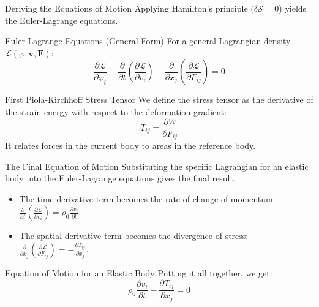 \documentclass{beamer}
\begin{document}
\begin{frame}{Deriving the Equations of Motion}
    Applying Hamilton's principle ($\delta\mathcal{S}=0$) yields the Euler-Lagrange equations.

    \begin{block}{Euler-Lagrange Equations (General Form)}
        For a general Lagrangian density $\mathcal{L}(\varphi, \mathbf{v}, \mathbf{F})$:
        $$ \frac{\partial\mathcal{L}}{\partial\varphi_{i}} - \frac{\partial}{\partial t}\left(\frac{\partial\mathcal{L}}{\partial v_{i}}\right) - \frac{\partial}{\partial x_{j}}\left(\frac{\partial\mathcal{L}}{\partial F_{ij}}\right) = 0 $$
    \end{block}
    \pause
    \begin{block}{First Piola-Kirchhoff Stress Tensor}
        We define the stress tensor as the derivative of the strain energy with respect to the deformation gradient:
        $$ T_{ij} = \frac{\partial W}{\partial F_{ij}} $$
        It relates forces in the current body to areas in the reference body.
    \end{block}
\end{frame}


\begin{frame}{The Final Equation of Motion}
    Substituting the specific Lagrangian for an elastic body into the Euler-Lagrange equations gives the final result.

    \begin{itemize}
        \item The time derivative term becomes the rate of change of momentum: $\frac{\partial}{\partial t}\left(\frac{\partial\mathcal{L}}{\partial v_{i}}\right) = \rho_0 \frac{\partial v_i}{\partial t}$.
        \item The spatial derivative term becomes the divergence of stress: $\frac{\partial}{\partial x_{j}}\left(\frac{\partial\mathcal{L}}{\partial F_{ij}}\right) = -\frac{\partial T_{ij}}{\partial x_j}$.
    \end{itemize}
    \pause
    \begin{alertblock}{Equation of Motion for an Elastic Body}
         Putting it all together, we get:
        $$ \rho_0 \frac{\partial v_i}{\partial t} - \frac{\partial T_{ij}}{\partial x_j} = 0 $$
    \end{alertblock}
\end{frame}
\end{document}
